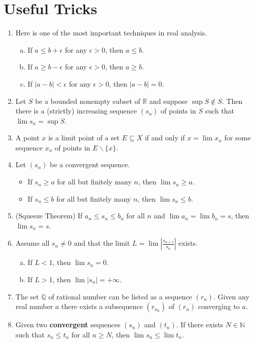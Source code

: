 \documentclass[12pt, lettersize]{book}
\theoremstyle{plain}
\theoremstyle{definition}
\theoremstyle{remark}
\newcommand{\R}{\mathbb{R}}
\newcommand{\N}{\mathbb{N}}
\begin{document}
	\chapter{Useful Tricks}
	\begin{enumerate}
		\item Here is one of the most important techniques in real analysis.
		\begin{enumerate}[(a)]
			\item If $a\leq b+\epsilon$ for any $\epsilon>0$, then $a\leq b$.
			\item If $a\geq b-\epsilon$ for any $\epsilon>0$, then $a\geq b$.
			\item If $|a-b|<\epsilon$ for any $\epsilon>0$, then $|a-b|=0$.
		\end{enumerate}
		\item Let $S$ be a bounded nonempty subset of $\R$ and suppose $\sup S\notin S$. Then there is a (strictly) increasing sequence $(s_n)$ of points in $S$ such that $\lim s_n=\sup S$.
		\item A point $x$ is a limit point of a set $E\subseteq X$ if and only if $x=\lim x_n$ for some sequence $x_n$ of points in $E\backslash\{x\}$. 
		\item Let $(s_n)$ be a convergent sequence.
		\begin{itemize}
			\item If $s_n\geq a$ for all but finitely many $n$, then $\lim s_n\geq a$.
			\item If $s_n\leq b$ for all but finitely many $n$, then $\lim s_n\leq b$.
		\end{itemize}
		\item (Squeeze Theorem) If $a_n\leq s_n\leq b_n$ for all $n$ and $\lim a_n=\lim b_n=s$, then $\lim s_n=s$.
		\item Assume all $s_n\neq0$ and that the limit $L=\lim\left|\frac{s_{n+1}}{s_n}\right|$ exists.
		\begin{enumerate}[(a)]
			\item If $L<1$, then $\lim s_n=0$.
			\item If $L>1$, then $\lim |s_n|=+\infty$.
		\end{enumerate} 
		\item The set $\mathbb{Q}$ of rational number can be listed as a sequence $(r_n)$. Given any real number $a$ there exists a subsequence $(r_{n_k})$ of $(r_n)$ converging to $a$.
		\item Given two \textbf{convergent} sequences $(s_n)$ and $(t_n)$. If there exists $N\in\N$ such that $s_n\leq t_n$ for all $n\geq N$, then $\lim s_n\leq\lim t_n$.

\end{enumerate}
\end{document}
